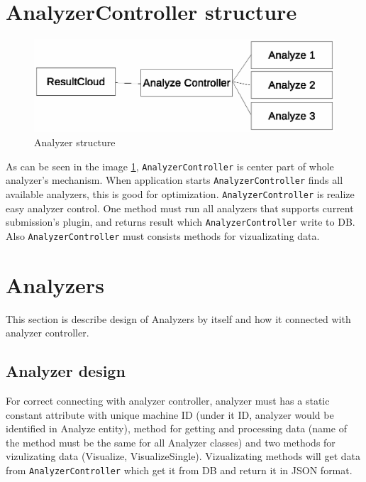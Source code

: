 \section{AnalyzerController structure}

\begin{figure}
  \centering
    \includegraphics[trim=0 22cm 0 0,scale=0.8]{fig/analyzer-struct.eps}
  \caption{Analyzer structure}
  \label{fig:an_struct}
\end{figure}

As can be seen in the image \ref{fig:an_struct}, \texttt{AnalyzerController} is center part of whole analyzer's mechanism. When application starts \texttt{AnalyzerController} finds all available analyzers, this is good for optimization. \texttt{AnalyzerController} is realize easy analyzer control. One method must run all analyzers that supports current submission's plugin, and returns result which \texttt{AnalyzerController} write to DB. Also \texttt{AnalyzerController} must consists methods for vizualizating data.

\section{Analyzers}

This section is describe design of Analyzers by itself and how it connected with analyzer controller.

\subsection{Analyzer design}

For correct connecting with analyzer controller, analyzer must has a static constant attribute with unique machine ID (under it ID, analyzer would be identified in Analyze entity), method for getting and processing data (name of the method must be the same for all Analyzer classes) and two methods for vizulizating data (Visualize, VisualizeSingle). Vizualizating methods will get data from \texttt{AnalyzerController} which get it from DB and return it in JSON format.

